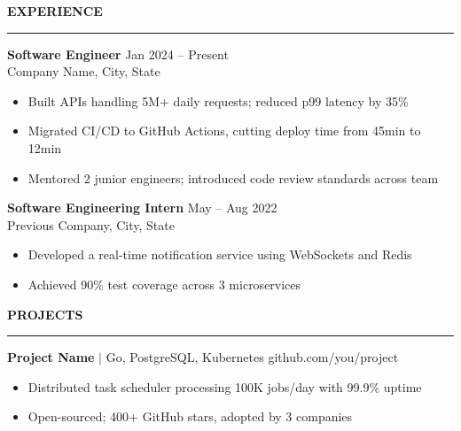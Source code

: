 \documentclass[a4paper]{article}
\begin{document}
\begin{minipage}[t]{0.65\textwidth}
\vspace{12pt}
\raggedright

{\small \textbf{EXPERIENCE}}
\noindent\rule{0.95\textwidth}{0.3pt}

\vspace{4pt}
\textbf{Software Engineer} \hfill {\footnotesize \color{gray} Jan 2024 -- Present} \\
{\small \color{gray} Company Name, City, State}
\begin{itemize}[leftmargin=1.2em, noitemsep, topsep=2pt]
  \item {\footnotesize Built APIs handling 5M+ daily requests; reduced p99 latency by 35\%}
  \item {\footnotesize Migrated CI/CD to GitHub Actions, cutting deploy time from 45min to 12min}
  \item {\footnotesize Mentored 2 junior engineers; introduced code review standards across team}
\end{itemize}

\vspace{6pt}
\textbf{Software Engineering Intern} \hfill {\footnotesize \color{gray} May -- Aug 2022} \\
{\small \color{gray} Previous Company, City, State}
\begin{itemize}[leftmargin=1.2em, noitemsep, topsep=2pt]
  \item {\footnotesize Developed a real-time notification service using WebSockets and Redis}
  \item {\footnotesize Achieved 90\% test coverage across 3 microservices}
\end{itemize}

\vspace{10pt}
{\small \textbf{PROJECTS}}
\noindent\rule{0.95\textwidth}{0.3pt}

\vspace{4pt}
\textbf{Project Name} {\footnotesize $|$ Go, PostgreSQL, Kubernetes} \hfill {\footnotesize \color{gray} github.com/you/project} \\
\begin{itemize}[leftmargin=1.2em, noitemsep, topsep=2pt]
  \item {\footnotesize Distributed task scheduler processing 100K jobs/day with 99.9\% uptime}
  \item {\footnotesize Open-sourced; 400+ GitHub stars, adopted by 3 companies}
\end{itemize}


\end{minipage}
\end{document}
